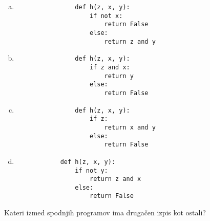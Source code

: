 \documentclass[arhiv, 10pt]{../izpit}
\begin{document}
        \begin{multicols}{2}
        \begin{enumerate}[(a)]
\item 
                \begin{verbatim}
                def h(z, x, y):
                    if not x:
                        return False
                    else:
                        return z and y
                \end{verbatim}
            
\item 
                \begin{verbatim}
                def h(z, x, y):
                    if z and x:
                        return y
                    else:
                        return False
                \end{verbatim}
            
\item 
                \begin{verbatim}
                def h(z, x, y):
                    if z:
                        return x and y
                    else:
                        return False
                \end{verbatim}
            
\item 
            \begin{verbatim}
            def h(z, x, y):
                if not y:
                    return z and x
                else:
                    return False
            \end{verbatim}
        
\end{enumerate}

        \end{multicols}
    
        \naloga*
        
        Kateri izmed spodnjih programov ima drugačen izpis kot ostali?
    
\end{document}
